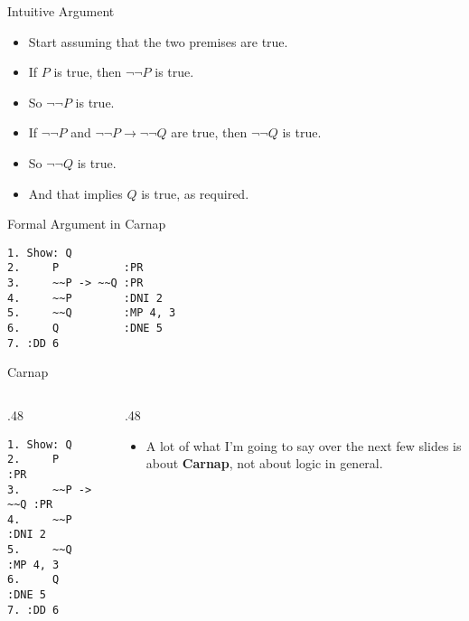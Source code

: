 \documentclass[
  ignorenonframetext,
]{beamer}
\providecommand{\tightlist}{%
  \setlength{\itemsep}{0pt}\setlength{\parskip}{0pt}}
\renewcommand{\,}{\text{, }}
\def\begincols{\begin{columns}}
\def\begincol{\begin{column}}
\def\endcol{\end{column}}
\def\endcols{\end{columns}}
\begin{document}
\begin{frame}{Intuitive Argument}
\protect\hypertarget{intuitive-argument}{}

\begin{itemize}[<+->]
\tightlist
\item
  Start assuming that the two premises are true.
\item
  If \(P\) is true, then \(\neg \neg P\) is true.
\item
  So \(\neg \neg P\) is true.
\item
  If \(\neg \neg P\) and \(\neg \neg P \rightarrow \neg \neg Q\) are
  true, then \(\neg \neg Q\) is true.
\item
  So \(\neg \neg Q\) is true.
\item
  And that implies \(Q\) is true, as required.
\end{itemize}

\end{frame}

\begin{frame}[fragile]{Formal Argument in Carnap}
\protect\hypertarget{formal-argument-in-carnap}{}

\begin{verbatim}
1. Show: Q
2.     P          :PR
3.     ~~P -> ~~Q :PR
4.     ~~P        :DNI 2
5.     ~~Q        :MP 4, 3
6.     Q          :DNE 5
7. :DD 6
\end{verbatim}

\end{frame}

\begin{frame}[fragile]{Carnap}
\protect\hypertarget{carnap}{}

\begincols
\begincol{.48\textwidth}

\begin{verbatim}
1. Show: Q
2.     P          :PR
3.     ~~P -> ~~Q :PR
4.     ~~P        :DNI 2
5.     ~~Q        :MP 4, 3
6.     Q          :DNE 5
7. :DD 6
\end{verbatim}

\endcol
\begincol{.48\textwidth}

\begin{itemize}
\tightlist
\item
  A lot of what I'm going to say over the next few slides is about
  \textbf{Carnap}, not about logic in general.
\end{itemize}

\endcol
\endcols

\end{frame}
\end{document}
